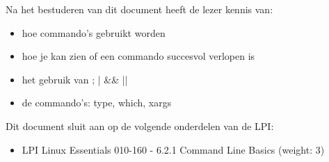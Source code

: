 Na het bestuderen van dit document heeft de lezer kennis van:
\begin{itemize}
\item hoe commando's gebruikt worden
\item hoe je kan zien of een commando succesvol verlopen is
\item het gebruik van ; | \&\& ||
\item de commando's: type, which, xargs
\end{itemize}

Dit document sluit aan op de volgende onderdelen van de LPI:
\begin{itemize}
\item LPI Linux Essentials 010-160 - 6.2.1 Command Line Basics (weight: 3)
\end{itemize}

